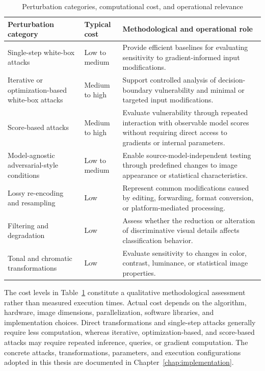 \begin{table}[H]
\centering
\caption{Perturbation categories, computational cost, and operational relevance}
\label{tab:methodology-attack-cost-operational-relevance}
\begin{tabularx}{\textwidth}{@{}
>{\raggedright\arraybackslash}p{}
>{\raggedright\arraybackslash}p{}
X
@{}}
\toprule
\textbf{Perturbation category} &
\textbf{Typical cost} &
\textbf{Methodological and operational role} \\
\midrule

Single-step white-box attacks
&
Low to medium
&
Provide efficient baselines for evaluating sensitivity to gradient-informed
input modifications. \\

Iterative or optimization-based white-box attacks
&
Medium to high
&
Support controlled analysis of decision-boundary vulnerability and minimal or
targeted input modifications. \\

Score-based attacks
&
Medium to high
&
Evaluate vulnerability through repeated interaction with observable model
scores without requiring direct access to gradients or internal parameters. \\

Model-agnostic adversarial-style conditions
&
Low to medium
&
Enable source-model-independent testing through predefined changes to image
appearance or statistical characteristics. \\

Lossy re-encoding and resampling
&
Low
&
Represent common modifications caused by editing, forwarding, format
conversion, or platform-mediated processing. \\

Filtering and degradation
&
Low
&
Assess whether the reduction or alteration of discriminative visual details
affects classification behavior. \\

Tonal and chromatic transformations
&
Low
&
Evaluate sensitivity to changes in color, contrast, luminance, or statistical
image properties. \\

\bottomrule
\end{tabularx}
\end{table}

The cost levels in
Table~\ref{tab:methodology-attack-cost-operational-relevance} constitute a
qualitative methodological assessment rather than measured execution times.
Actual cost depends on the algorithm, hardware, image dimensions,
parallelization, software libraries, and implementation choices. Direct
transformations and single-step attacks generally require less computation,
whereas iterative, optimization-based, and score-based attacks may require
repeated inference, queries, or gradient computation. The concrete attacks,
transformations, parameters, and execution configurations adopted in this
thesis are documented in Chapter~\ref{chap:implementation}.

